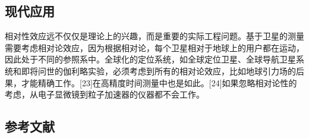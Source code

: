 \subsection{现代应用}

相对性效应远不仅仅是理论上的兴趣，而是重要的实际工程问题。基于卫星的测量需要考虑相对论效应，因为根据相对论，每个卫星相对于地球上的用户都在运动，因此处于不同的参照系中。全球化的定位系统，如全球定位卫星、全球导航卫星系统和即将问世的伽利略实验，必须考虑到所有的相对论效应，比如地球引力场的后果，才能精确工作。[23]在高精度时间测量中也是如此。[24]如果忽略相对论性的考虑，从电子显微镜到粒子加速器的仪器都不会工作。

\subsection{参考文献}

